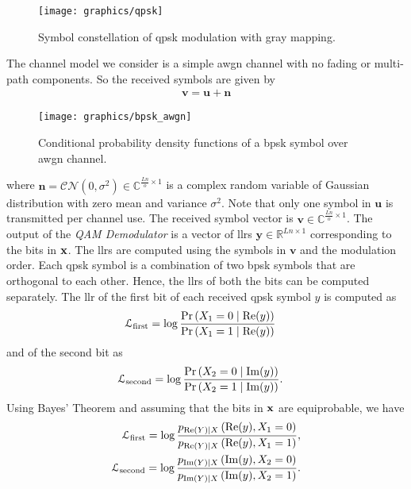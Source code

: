 \begin{figure}[htbp]
  \centering
  \texttt{[image: graphics/qpsk]}
  \caption{Symbol constellation of \ac{qpsk} modulation with gray mapping.}
  \label{fig:qpsk}
\end{figure}

The channel model we consider is a simple \ac{awgn} channel with no fading or multi-path components. So the received symbols are given by \begin{align}\mathbf{v}=\mathbf{u}+\mathbf{n}\end{align}
\begin{figure}[htbp]
  \centering
  \texttt{[image: graphics/bpsk\_awgn]}
  \caption{Conditional probability density functions of a \ac{bpsk} symbol over \ac{awgn} channel.}
  \label{fig:bpsk_awgn}
\end{figure}
where $\mathbf{n}=\mathcal{CN}(0,\sigma^2)\in\mathbb{C}^{\frac{Ln}{o}\times 1}$ is a complex random variable of Gaussian distribution with zero mean and variance $\sigma^2$. Note that only one symbol in $\mathbf{u}$ is transmitted per channel use. The received symbol vector is $\mathbf{v}\in\mathbb{C}^{\frac{Ln}{o}\times 1}$. The output of the \emph{QAM Demodulator} is a vector of \acp{llr} $\mathbf{y}\in\mathbb{R}^{Ln\times 1}$ corresponding to the bits in $\mathbf{x}$. The \acp{llr} are computed using the symbols in $\mathbf{v}$ and the modulation order. Each \ac{qpsk} symbol is a combination of two \ac{bpsk} symbols that are orthogonal to each other. Hence, the \acp{llr} of both the bits can be computed separately. The \ac{llr} of the first bit of each received \ac{qpsk} symbol $y$ is computed as
\begin{align}
\mathcal{L}_{\text{first}}&=\log\frac{\text{Pr}\left(X_1=0\mid\operatorname{Re}(y)\right)}{\text{Pr}\left(X_1=1\mid\operatorname{Re}(y)\right)}
\end{align}
and of the second bit as
\begin{align}
\mathcal{L}_{\text{second}}&=\log\frac{\text{Pr}\left(X_2=0\mid\operatorname{Im}(y)\right)}{\text{Pr}\left(X_2=1\mid\operatorname{Im}(y)\right)}.
\end{align}
Using Bayes' Theorem and assuming that the bits in $\mathbf{x}$ are equiprobable, we have
\begin{align}
\mathcal{L}_{\text{first}}=\log\frac{p_{\operatorname{Re}(Y)\mid X}\left(\operatorname{Re}(y), X_1=0\right)}{p_{\operatorname{Re}(Y)\mid X}\left(\operatorname{Re}(y), X_1=1\right)},\\
\mathcal{L}_{\text{second}}=\log\frac{p_{\operatorname{Im}(Y)\mid X}\left(\operatorname{Im}(y), X_2=0\right)}{p_{\operatorname{Im}(Y)\mid X}\left(\operatorname{Im}(y), X_2=1\right)}.
\end{align}
